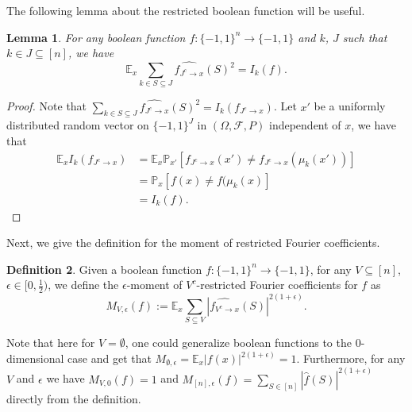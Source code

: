\documentclass[10pt]{article} \usepackage[utf8]{inputenc}
\newtheorem{lem}{Lemma}[section]
\theoremstyle{definition}
\newtheorem{defn}[lem]{Definition}
\theoremstyle{remark}
\numberwithin{equation}{section}
\begin{document}
The following lemma about the restricted boolean function will be useful.
\begin{lem}
\label{L22}
For any boolean function $f:\{-1,1\}^n \to \{-1,1\}$ and $k$, $J$ such that $k\in J \subseteq [n]$, we have
\begin{equation}
\mathbb{E}_x \sum_{k\in S\subseteq J} \widehat{f_{J^c \to x}}(S)^2 =I_k(f).
\end{equation}
\end{lem}
\begin{proof}    
Note that $\sum_{k \in S\subseteq J} \widehat{f_{J^c \to x}}(S)^2=I_k(f_{J^c \to x})$. Let $x'$ be a uniformly distributed random vector  on $\{-1,1\}^J$ in $(\Omega, \mathcal{F}, P)$ independent of $x$, we have that
\begin{equation}
\begin{aligned}
\mathbb{E}_x I_k(f_{J^c \to x}) &=\mathbb{E}_x \mathbb{P}_{x'}[f_{J^c \to x}(x')\neq f_{J^c \to x}(\mu_k(x'))]\\
&=\mathbb{P}_x[f(x)\neq f(\mu_k(x)]\\
&=I_k(f).
\end{aligned}
\end{equation}
\end{proof}

Next, we give the definition for the moment of restricted Fourier coefficients.
\begin{defn}
Given a boolean function $f:\{-1,1\}^n\to \{-1,1\}$, for any $V \subseteq [n]$, $\epsilon \in [0, \frac{1}{2})$, we define the $\epsilon$-moment of $V^c$-restricted Fourier coefficients for $f$ as
\begin{equation}
M_{V,\epsilon}(f):=\mathbb{E}_{x}\sum_{S\subseteq V}{|\widehat{f_{V^{c} \to x}}(S)|^{2(1+\epsilon)}}.
\end{equation} 
\end{defn}
Note that here for $V=\emptyset$, one could generalize boolean functions to the 0-dimensional case and get that $M_{\emptyset, \epsilon}=\mathbb{E}_x |f(x)|^{2(1+\epsilon)}=1$. Furthermore, for any $V$ and $\epsilon$ we have $M_{V,0}(f)=1$ and $M_{[n],\epsilon}(f)=\sum\limits_{S\in[n]} |\hat{f}(S)|^{2(1+\epsilon)}$ directly from the definition. 
\end{document}
